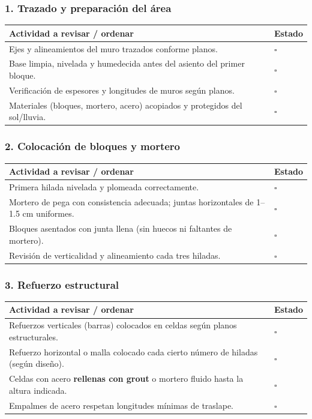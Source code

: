\documentclass[12pt]{article}
\newcommand{\cbox}{\(\square\)} %
\begin{document}
	\subsubsection*{1. Trazado y preparación del área}
	\begin{tabularx}{\linewidth}{>{\raggedright\arraybackslash}p{0.93\linewidth} >{\centering\arraybackslash}m{0.07\linewidth}}
		\toprule
		\textbf{Actividad a revisar / ordenar} & \textbf{Estado}\\
		\midrule
		Ejes y alineamientos del muro trazados conforme planos. & \cbox \\
		Base limpia, nivelada y humedecida antes del asiento del primer bloque. & \cbox \\
		Verificación de espesores y longitudes de muros según planos. & \cbox \\
		Materiales (bloques, mortero, acero) acopiados y protegidos del sol/lluvia. & \cbox \\
		\bottomrule
	\end{tabularx}
	
	\subsubsection*{2. Colocación de bloques y mortero}
	\begin{tabularx}{\linewidth}{>{\raggedright\arraybackslash}p{0.93\linewidth} >{\centering\arraybackslash}m{0.07\linewidth}}
		\toprule
		\textbf{Actividad a revisar / ordenar} & \textbf{Estado}\\
		\midrule
		Primera hilada nivelada y plomeada correctamente. & \cbox \\
		Mortero de pega con consistencia adecuada; juntas horizontales de 1–1.5 cm uniformes. & \cbox \\
		Bloques asentados con junta llena (sin huecos ni faltantes de mortero). & \cbox \\
		Revisión de verticalidad y alineamiento cada tres hiladas. & \cbox \\
		\bottomrule
	\end{tabularx}
	
	\subsubsection*{3. Refuerzo estructural}
	\begin{tabularx}{\linewidth}{>{\raggedright\arraybackslash}p{0.93\linewidth} >{\centering\arraybackslash}m{0.07\linewidth}}
		\toprule
		\textbf{Actividad a revisar / ordenar} & \textbf{Estado}\\
		\midrule
		Refuerzos verticales (barras) colocados en celdas según planos estructurales. & \cbox \\
		Refuerzo horizontal o malla colocado cada cierto número de hiladas (según diseño). & \cbox \\
		Celdas con acero \textbf{rellenas con grout} o mortero fluido hasta la altura indicada. & \cbox \\
		Empalmes de acero respetan longitudes mínimas de traslape. & \cbox \\
		\bottomrule
	\end{tabularx}
	
\end{document}
